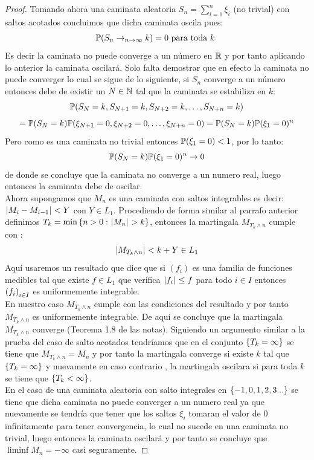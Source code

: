 \documentclass[a5paper,oneside]{amsart}
\theoremstyle{plain}
\theoremstyle{definition}
\begin{document}
\begin{proof}
Tomando ahora una caminata aleatoria $S_n=\sum_{i=1}^{n}\xi_i$ (no trivial) con saltos acotados concluimos que dicha caminata  oscila pues:
$$
 \mathbb{P} (S_n\rightarrow_{n\rightarrow \infty} k)=0  \text{ para toda $k$ }
$$
Es decir la caminata no puede converge a un n\'umero en $\mathbb{R}$ y por tanto aplicando  lo anterior  la caminata oscilar\'a. Solo falta demostrar que en efecto la caminata no puede converger lo cual se sigue de lo siguiente, si $S_n$ converge a un n\'umero entonces debe de existir un $N \in \mathbb{N}$ tal que  la caminata se estabiliza en $k$:
$$
 \mathbb{P} (S_N=k,S_{N+1}=k,S_{N+2}=k,\ldots,S_{N+n}=k)$$$$= \mathbb{P} (S_N=k) \mathbb{P} (\xi_{N+1}=0,\xi_{N+2}=0,\ldots,\xi_{N+n}=0)= \mathbb{P} (S_N=k) \mathbb{P} (\xi_{1}=0)^n
$$
Pero como es una caminata no trivial entonces $ \mathbb{P} (\xi_{1}=0)<1$, por lo tanto: $$ \mathbb{P} (S_N=k) \mathbb{P} (\xi_{1}=0)^n \rightarrow 0$$ de donde se concluye que  la caminata no converge a un numero real, luego entonces la caminata debe de oscilar.\\
Ahora supongamos que $M_n$ es una caminata con saltos integrables es decir: $\hspace{.25mm}\left|M_i-M_{i-1}\right|\hspace{.25mm} < Y$ con $Y \in L_1$. Procediendo de forma similar al parrafo anterior definimos $T_k=\min\left\{ n>0:\hspace{.25mm}\left|M_n\right|\hspace{.25mm}>k\right\} $, entonces la martingala $M_{T_{k} \wedge n}$  cumple con :
$$
\hspace{.25mm}\left|M_{T_{k}\wedge n}\right|\hspace{.25mm} < k + Y \in L_1
$$
Aqu\'i usaremos un resultado que dice que si $(f_i)$ es una familia de funciones medibles tal que existe $f \in L_1$ que verifica $\hspace{.25mm}\left|f_i\right|\hspace{.25mm} \leq f$ para todo $i \in I$ entonces $\left( f_i\right) _{i\in I}$ es uniformemente integrable.\\
En nuestro caso $M_{T_{k}\wedge n}$ cumple con las condiciones del resultado y por tanto  $M_{T_{k}\wedge n}$ es uniformemente integrable.  De aqu\'i se concluye  que la martingala  $M_{T_{k}\wedge n}$ converge (Teorema 1.8 de las notas).  Siguiendo un argumento similar a la prueba del caso de salto acotados tendr\'iamos que en el conjunto $\left\{ T_k=\infty\right\} $ se tiene que $M_{T_{k}\wedge n}=M_n$ y por tanto la martingala converge si existe $k$ tal que $\left\{ T_k=\infty\right\} $ y nuevamente en caso contrario  , la martingala oscilara si para toda $k$ se tiene que $\left\{ T_k < \infty\right\} $.\\
En el caso de una caminata aleatoria con salto integrales en $\left\{ -1,0,1,2,3...\right\} $ se tiene que dicha  caminata no puede converger a un numero real  ya que  nuevamente se tendr\'ia que tener que los saltos $\xi_i$ tomaran el valor de $0$ infinitamente para tener convergencia, lo cual no sucede en una caminata no trivial, luego entonces la caminata oscilar\'a y por tanto se concluye que $\liminf M_n=-\infty$ casi seguramente.\qedhere
\end{proof}
\end{document}
